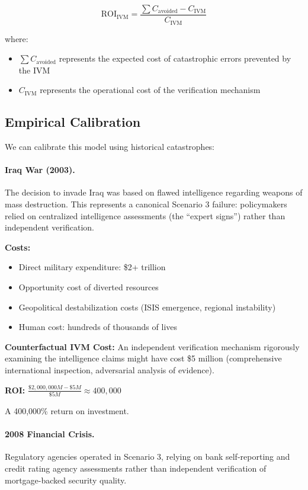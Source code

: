 \documentclass[11pt,a4paper]{article}
\begin{document}
\begin{small}
\begin{equation}
\text{ROI}_{\text{IVM}} = \frac{\sum C_{\text{avoided}} - C_{\text{IVM}}}{C_{\text{IVM}}}
\end{equation}

where:
\begin{itemize}
    \item $\sum C_{\text{avoided}}$ represents the expected cost of catastrophic errors prevented by the IVM
    \item $C_{\text{IVM}}$ represents the operational cost of the verification mechanism
\end{itemize}

\subsection{Empirical Calibration}

We can calibrate this model using historical catastrophes:

\paragraph{Iraq War (2003).} The decision to invade Iraq was based on flawed intelligence regarding weapons of mass destruction. This represents a canonical Scenario 3 failure: policymakers relied on centralized intelligence assessments (the ``expert signs'') rather than independent verification.

\textbf{Costs:}
\begin{itemize}
    \item Direct military expenditure: \$2+ trillion
    \item Opportunity cost of diverted resources
    \item Geopolitical destabilization costs (ISIS emergence, regional instability)
    \item Human cost: hundreds of thousands of lives
\end{itemize}

\textbf{Counterfactual IVM Cost:} An independent verification mechanism rigorously examining the intelligence claims might have cost \$5 million (comprehensive international inspection, adversarial analysis of evidence).

\textbf{ROI:} $\frac{\$2,000,000M - \$5M}{\$5M} \approx 400,000$

A 400,000\% return on investment.

\paragraph{2008 Financial Crisis.} Regulatory agencies operated in Scenario 3, relying on bank self-reporting and credit rating agency assessments rather than independent verification of mortgage-backed security quality.


\end{small}
\end{document}
